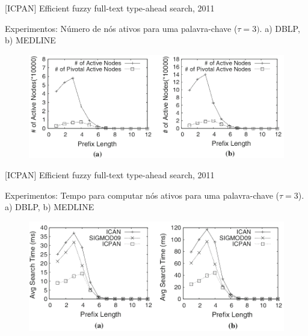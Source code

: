 \documentclass[11pt]{beamer}
\begin{document}
\begin{frame}{[ICPAN] Efficient fuzzy full-text type-ahead search, 2011}
    
    Experimentos: Número de nós ativos para uma palavra-chave ($\tau = 3)$. a) DBLP, b) MEDLINE

    \begin{figure}
      \includegraphics[scale=0.33]{pictures/icpan_6_ex.png}
      \centering
    \end{figure}
    
\end{frame}

\begin{frame}{[ICPAN] Efficient fuzzy full-text type-ahead search, 2011}
    
    Experimentos: Tempo para computar nós ativos para uma palavra-chave ($\tau = 3$). a) DBLP, b) MEDLINE

    \begin{figure}
      \includegraphics[scale=0.33]{pictures/icpan_7_ex.png}
      \centering
    \end{figure}
    
\end{frame}
\end{document}
